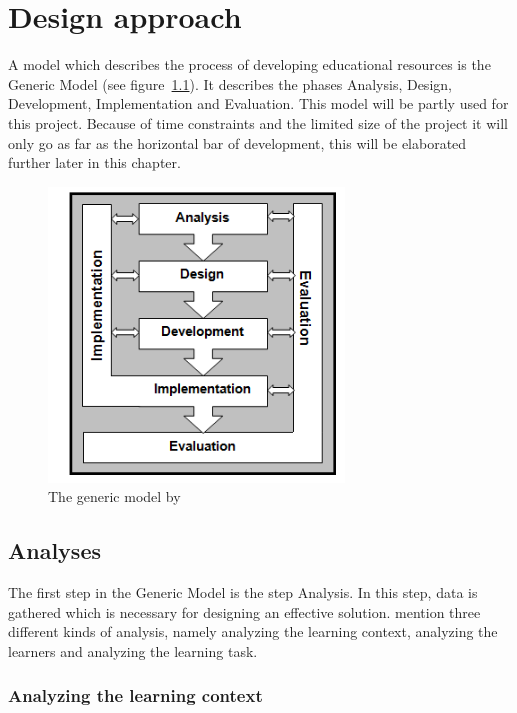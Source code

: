 \documentclass[12pt]{report} %
\begin{document}
\chapter{Design approach}

A model which describes the process of developing educational resources is the Generic Model \cite{genericmodel} (see figure~\ref{fig:genmod}). It describes the phases Analysis, Design, Development, Implementation and Evaluation. This model will be partly used for this project. Because of time constraints and the limited size of the project it will only go as far as the horizontal bar of development, this will be elaborated further later in this chapter.

\begin{figure}[h]
\centering
\includegraphics[width=0.7\textwidth]{genericmodel}
\caption{\footnotesize The generic model by \protect{}\label{fig:genmod}}
\end{figure}

\section{Analyses}

The first step in the Generic Model \cite{genericmodel} is the step Analysis. In this step, data is gathered which is necessary for designing an effective solution.  mention three different kinds of analysis, namely analyzing the learning context, analyzing the learners and analyzing the learning task.

\subsection{Analyzing the learning context}
\end{document}
